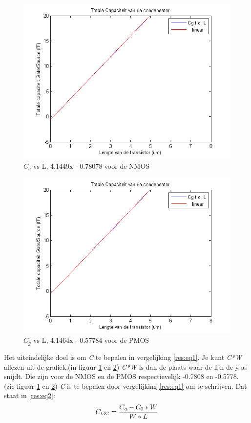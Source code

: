  \begin{figure} [h!]
 \centering
 \includegraphics [scale = 0.4] {figures/c0.png}
 \caption{$C_g$ vs L, 4.1449x  - 0.78078 voor de NMOS}
 \label{res:3}
 \end{figure}
 
 \begin{figure} [h!]
 \centering
 \includegraphics [scale = 0.4] {figures/c0p.png}
 \caption{$C_g$ vs L, 4.1464x  - 0.57784 voor de PMOS}
 \label{res:4}
 \end{figure}
 Het uiteindelijke doel is om \textit{C} te bepalen in vergelijking \ref{res:eq1}. Je kunt \textit{C*W} aflezen uit de grafiek.(in figuur \ref{res:3} en \ref{res:4})  \textit{C*W} is dan de plaats waar de lijn de y-as snijdt. Die zijn voor de NMOS en de PMOS respectievelijk -0.7808 en -0.5778. (zie figuur \ref{res:3} en \ref{res:4}) \textit{C} is te bepalen door vergelijking \ref{res:eq1} om te schrijven. Dat staat in \ref{res:eq2}:
 \begin{equation} \label{res:eq2}
C\textsubscript{GC} = \frac{C_g - C_0*W}{W*L}
 \end{equation}
 
